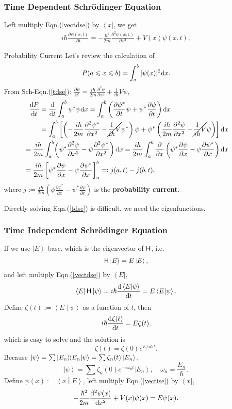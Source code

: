 \documentclass{article}
\def\d{{\rm d}}
\newcommand{\ko}[1]{\hspace{-#1 pt}}%
\newcommand{\su}[1]{\vspace{-#1 pt}}%
\newcommand{\ds}[2]{\frac{\d #1}{\d #2}}%
\newcommand{\sds}[2]{\frac{\d^2 #1}{\d #2^2}}
\newcommand{\pd}[2]{\frac{\partial #1}{\partial #2}}%
\newcommand{\spd}[2]{\frac{\partial^2 #1}{\partial #2^2}}
\newcommand{\bra}[1]{\left\langle #1\right\vert}
\newcommand{\ket}[1]{\left\vert #1\right\rangle}
\newcommand{\brkt}[2]{\left\langle #1\middle\vert#2\right\rangle}
\newcommand{\kh}[1]{\left(#1\right)}
\newcommand{\fkh}[1]{\left[#1\right]}
\newcommand{\spark}[1]{\textcolor{red}{#1}}
\begin{document}
\subsubsection{Time Dependent Schrödinger Equation}
Left multiply Eqn.(\ref{vectdse}) by $\bra x$, we get
\begin{align}\label{tdse}
	i\hbar\pd{\psi(x,t)}t=-\frac{\hbar^2}{2m}\spd{\psi(x,t)}x+V(x)\psi(x,t),
\end{align}
\begin{definition}{Probability Current}{}
	Let's review the calculation of
	$$P(a\leqslant x\leqslant b)=\int_a^b|\psi(x)|^2\d x.$$
	From Sch-Eqn.(\ref{tdse}): $\pd\psi{t}=\frac{i\hbar}{2m}\spd\psi{x}+\frac1{i\hbar}V\psi$,
	\begin{align*}
		\begin{aligned}
			\ds{P}t & =\ds{}t\int_a^b\psi^*\psi\d x=\int_a^b\kh{\pd{\psi^*}t\psi+\psi^*\pd\psi{t}}\d x                                                                                        \\
			        & =\int_a^b\fkh{\kh{-\frac{i\hbar}{2m}\spd{\psi^*}x-\cancel{\ko1\frac1{i\hbar}V}\psi^*}\psi+\psi^*\kh{\frac{i\hbar}{2m}\spd\psi{x}+\ko1\cancel{\frac1{i\hbar}V}\psi}}\d x
		\end{aligned} \\
		\begin{aligned}
			 & =\frac{i\hbar}{2m}\int_a^b\ko2\kh{\psi^*\spd\psi{x}-\psi\spd{\psi^*}x}\d x=\frac{i\hbar}{2m}\int_a^b\pd{}x\kh{\psi^*\pd\psi{x}-\psi\pd{\psi^*}x}\d x \\
			 & =\frac{i\hbar}{2m}\fkh{\psi^*\pd\psi{x}-\psi\pd{\psi^*}x}_a^b=:j(a,t)-j(b,t),
		\end{aligned}
	\end{align*}
	where $j:=\frac{i\hbar}{2m}\kh{\psi\pd{\psi^*}x-\psi^*\pd{\psi}x}$ is the \textbf{probability current}.
\end{definition}
Directly solving Eqn.(\ref{tdse}) is difficult, we need the eigenfunctions.
\subsubsection{Time Independent Schrödinger Equation}
If we use $\ket E$ base, which is the eigenvector of $\mathsf H$, i.e.
\begin{align}\label{vectise}
	\sH\ket E=E\ket E,
\end{align}
and left multiply Eqn.(\ref{vectdse}) by $\bra E$,
$$\bra E\sH\ket\psi=i\hbar\ds{\brkt E\psi}t=E\brkt E\psi.$$
Define $\zeta(t):=\brkt E\psi$ as a function of $t$, then
$$i\hbar\ds{\zeta(t)}t=E\zeta(t),$$
which is easy to solve and the solution is
$$\zeta(t)=\zeta(0)e^{E/i\hbar\,t}.$$
Because $\ket\psi=\sum\ket{E_n}\ko3\brkt{E_n}\psi=\sum\zeta_n(t)\ket{E_n}$,
$$\ket\psi=\sum\zeta_n(0)e^{-i\omega_nt}\ket{E_n},\quad\omega_n=\frac{E_n}\hbar,$$
Define $\psi(x):=\brkt xE$, left multiply Eqn.(\ref{vectise}) by $\bra x$,
\spark{\begin{align}\label{tise}
		-\frac{\hbar^2}{2m}\sds{\psi(x)}x+V(x)\psi(x)=E\psi(x).
	\end{align}}\su{20}
\end{document}
